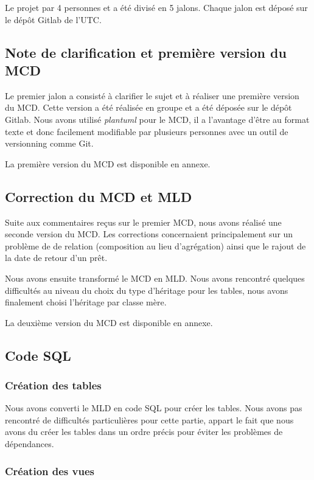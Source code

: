 \documentclass{report-UTC}
\begin{document}
Le projet par 4 personnes et a été divisé en 5 jalons. Chaque jalon est déposé 
sur le dépôt Gitlab de l'UTC. 

\subsection{Note de clarification et première version du MCD}

Le premier jalon a consisté à clarifier le sujet et à réaliser une première
version du MCD. Cette version a été réalisée en groupe et a été déposée sur
le dépôt Gitlab. Nous avons utilisé \textit{plantuml} pour le MCD, il a l'avantage
d'être au format texte et donc facilement modifiable par plusieurs personnes
avec un outil de versionning comme Git.

La première version du MCD est disponible en annexe.

\subsection{Correction du MCD et MLD}

Suite aux commentaires reçus sur le premier MCD, nous avons réalisé une seconde
version du MCD. Les corrections concernaient principalement sur un problème de
de relation (composition au lieu d'agrégation) ainsi que le rajout de la 
date de retour d'un prêt.

Nous avons ensuite transformé le MCD en MLD. Nous avons rencontré quelques
difficultés au niveau du choix du type d'héritage pour les tables, nous avons 
finalement choisi l'héritage par classe mère.

La deuxième version du MCD est disponible en annexe.

\subsection{Code SQL}
\subsubsection{Création des tables}

Nous avons converti le MLD en code SQL pour créer les tables. Nous avons pas 
rencontré de difficultés particulières pour cette partie, appart le fait que 
nous avons du créer les tables dans un ordre précis pour éviter les problèmes
de dépendances.

\subsubsection{Création des vues}
\end{document}
